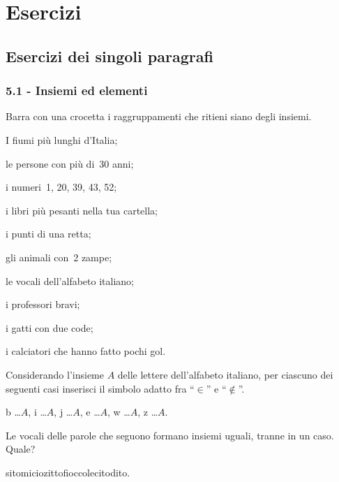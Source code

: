 \section{Esercizi}
\subsection{Esercizi dei singoli paragrafi}
\subsubsection*{5.1 - Insiemi ed elementi}

\begin{esercizio}
 \label{ese:5.1}
 Barra con una crocetta i raggruppamenti che ritieni siano degli insiemi.
 \begin{multicols}{2}
 \begin{enumeratea}
\item I fiumi più lunghi d'Italia;
\item le persone con più di~30 anni;
\item i numeri~1, 20, 39, 43, 52;
\item i libri più pesanti nella tua cartella;
\item i punti di una retta;
\item gli animali con~2 zampe;
\item le vocali dell'alfabeto italiano;
\item i professori bravi;
\item i gatti con due code;
\item i calciatori che hanno fatto pochi gol.
\end{enumeratea}
\end{multicols}
\end{esercizio}

\begin{esercizio}
 \label{ese:5.2}
Considerando l'insieme $A$ delle lettere dell'alfabeto italiano, per ciascuno dei seguenti casi inserisci il simbolo adatto fra ``$\in$'' e ``$\notin$''.

b \ldots $A$, i \ldots $A$, j \ldots $A$, e \ldots $A$, w \ldots $A$, z \ldots $A$.
\end{esercizio}

\begin{esercizio}
\label{ese:5.3}
Le vocali delle parole che seguono formano insiemi uguali, tranne in un caso. Quale?
\begin{center}
 \boxA\quad sito\quad\boxB\quad micio\quad\boxC\quad zitto\quad\boxD\quad fiocco\quad\boxE\quad lecito\quad\boxF\quad dito.
\end{center}
\end{esercizio}

